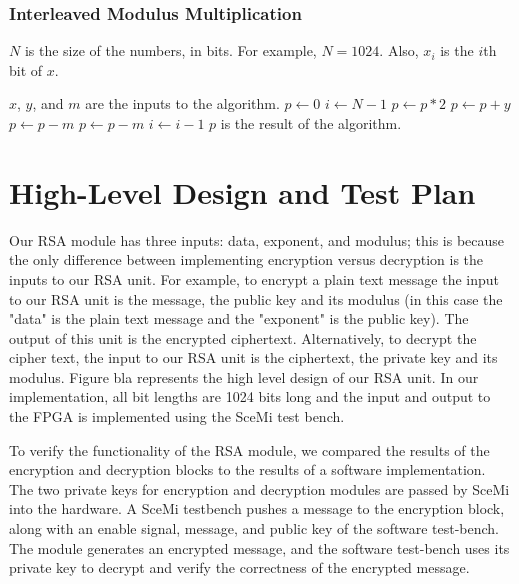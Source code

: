 \documentclass[a4paper,11pt]{report}
\begin{document}
\subsection{Interleaved Modulus Multiplication}
$N$ is the size of the numbers, in bits. For example, $N = 1024$.
Also, $x_i$ is the $i$th bit of $x$.
\begin{algorithmic}
\State $x$, $y$, and $m$ are the inputs to the algorithm.
\State $p \gets 0$
\State $i \gets N - 1$
	\State $p \gets p * 2$
		\State $p \gets p + y$
	\EndIf
		\State $p \gets p - m$
	\EndIf
		\State $p \gets p - m$
	\EndIf
  \State $i \gets i - 1$
\EndWhile
\State $p$ is the result of the algorithm.
\end{algorithmic}
\chapter*{High-Level Design and Test Plan} 
Our RSA module has three inputs: data, exponent, and modulus; this is because the only difference between implementing encryption versus decryption is the inputs to our RSA unit.  For example, to encrypt a plain text message the input to our RSA unit is the message, the public key and its modulus (in this case the "data" is the plain text message and the "exponent" is the public key). The output of this unit is the encrypted ciphertext.  Alternatively, to decrypt the cipher text, the input to our RSA unit is the ciphertext, the private key and its modulus.  Figure bla represents the high level design of our RSA unit.  In our implementation, all bit lengths are 1024 bits long and the input and output to the FPGA is implemented using the SceMi test bench.

 

To verify the functionality of the RSA module, we compared the results of the encryption and decryption blocks to the results
of a software implementation. The two private keys for encryption and
decryption modules are passed by SceMi into the hardware. A SceMi testbench
pushes a message to the encryption block, along with an enable signal, message,
and public key of the software test-bench. The module generates an encrypted message,
and the software test-bench uses its private key to decrypt and verify the 
correctness of the encrypted message.
\end{document}

